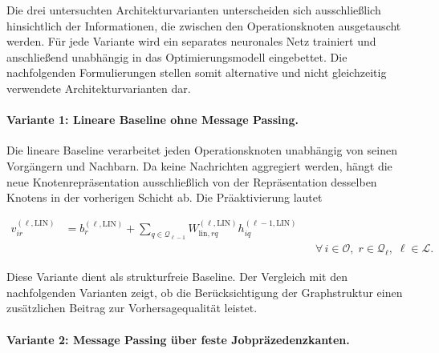 
Die drei untersuchten Architekturvarianten unterscheiden sich ausschließlich
hinsichtlich der Informationen, die zwischen den Operationsknoten
ausgetauscht werden. Für jede Variante wird ein separates neuronales Netz
trainiert und anschließend unabhängig in das Optimierungsmodell eingebettet.
Die nachfolgenden Formulierungen stellen somit alternative und nicht
gleichzeitig verwendete Architekturvarianten dar.



\paragraph{Variante 1: Lineare Baseline ohne Message Passing.}

Die lineare Baseline verarbeitet jeden Operationsknoten unabhängig von seinen
Vorgängern und Nachbarn. Da keine Nachrichten aggregiert werden, hängt die
neue Knotenrepräsentation ausschließlich von der Repräsentation desselben
Knotens in der vorherigen Schicht ab. Die Präaktivierung lautet

\begin{align}
v_{ir}^{(\ell,\mathrm{LIN})}
&=
b_r^{(\ell,\mathrm{LIN})}
+
\sum_{q\in\mathcal{Q}_{\ell-1}}
W_{\mathrm{lin},rq}^{(\ell,\mathrm{LIN})}
h_{iq}^{(\ell-1,\mathrm{LIN})}
\nonumber\\
&&&
\forall\,i\in\mathcal{O},\;
r\in\mathcal{Q}_\ell,\;
\ell\in\mathcal{L}.
\label{eq:gnn-linear-layer}
\end{align}

Diese Variante dient als strukturfreie Baseline. Der Vergleich mit den
nachfolgenden Varianten zeigt, ob die Berücksichtigung der Graphstruktur einen
zusätzlichen Beitrag zur Vorhersagequalität leistet.



\paragraph{Variante 2: Message Passing über feste Jobpräzedenzkanten.}


